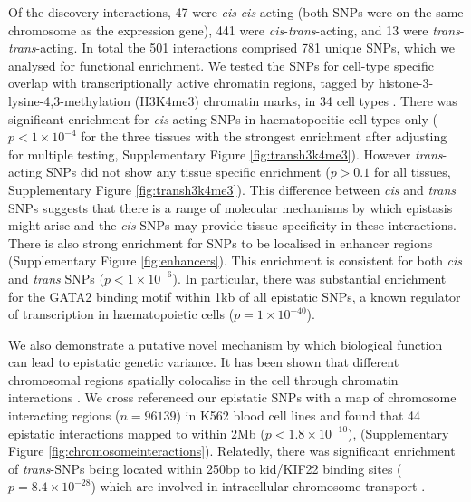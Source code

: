 \documentclass{article}
\begin{document}
Of the discovery interactions, 47 were \emph{cis}-\emph{cis} acting (both SNPs were on the same chromosome as the expression gene), 441 were \emph{cis}-\emph{trans}-acting, and 13 were \emph{trans}-\emph{trans}-acting. In total the 501 interactions comprised 781 unique SNPs, which we analysed for functional enrichment. We tested the SNPs for cell-type specific overlap with transcriptionally active chromatin regions, tagged by histone-3-lysine-4,3-methylation (H3K4me3) chromatin marks, in 34 cell types \cite{Trynka2013}. There was significant enrichment for \emph{cis}-acting SNPs in haematopoeitic cell types only ($p < 1 \times 10^{-4}$ for the three tissues with the strongest enrichment after adjusting for multiple testing, Supplementary Figure \ref{fig:transh3k4me3}). However \emph{trans}-acting SNPs did not show any tissue specific enrichment ($p > 0.1$ for all tissues, Supplementary Figure \ref{fig:transh3k4me3}). This difference between \emph{cis} and \emph{trans} SNPs suggests that there is a range of molecular mechanisms by which epistasis might arise and the \emph{cis}-SNPs may provide tissue specificity in these interactions. There is also strong enrichment for SNPs to be localised in enhancer regions \cite{Ward2012a} (Supplementary Figure \ref{fig:enhancers}). This enrichment is consistent for both \emph{cis} and \emph{trans} SNPs ($p < 1 \times 10^{-6}$). In particular, there was substantial enrichment for the GATA2 binding motif within 1kb of all epistatic SNPs, a known regulator of transcription in haematopoietic cells \cite{Tsai1994} ($p = 1 \times 10^{-40}$).

We also demonstrate a putative novel mechanism by which biological function can lead to epistatic genetic variance. It has been shown that different chromosomal regions spatially colocalise in the cell through chromatin interactions \cite{Lieberman-Aiden2009}. We cross referenced our epistatic SNPs with a map of chromosome interacting regions ($n = 96139$) in K562 blood cell lines \cite{Lan2012} and found that 44 epistatic interactions mapped to within 2Mb ($p < 1.8 \times 10^{-10}$), (Supplementary Figure \ref{fig:chromosomeinteractions}). Relatedly, there was significant enrichment of \emph{trans}-SNPs being located within 250bp to kid/KIF22 binding sites ($p = 8.4 \times 10^{-28}$) which are involved in intracellular chromosome transport \cite{Miki2001}.
\end{document}
